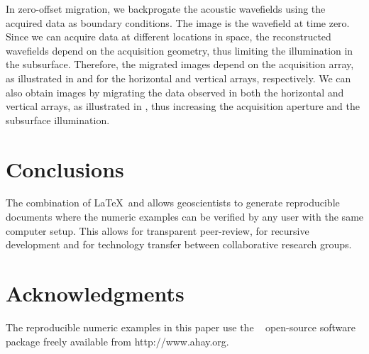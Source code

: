 

In zero-offset migration, we backprogate the acoustic wavefields using
the acquired data as boundary conditions. The image is the wavefield
at time zero. Since we can acquire data at different locations in
space, the reconstructed wavefields depend on the acquisition
geometry, thus limiting the illumination in the subsurface. Therefore,
the migrated images depend on the acquisition array, as illustrated in
 and  for the horizontal and vertical arrays,
respectively.  We can also obtain images by migrating the data
observed in both the horizontal and vertical arrays, as illustrated in
, thus increasing the acquisition aperture and the
subsurface illumination.



\section{Conclusions}
The combination of \LaTeX\ and \mg allows geoscientists to generate
reproducible documents where the numeric examples can be verified by
any user with the same computer setup. This allows for transparent
peer-review, for recursive development and for technology transfer
between collaborative research groups.

\section{Acknowledgments}
The reproducible numeric examples in this paper use the \mg~
open-source software package freely available from
http://www.ahay.org.



